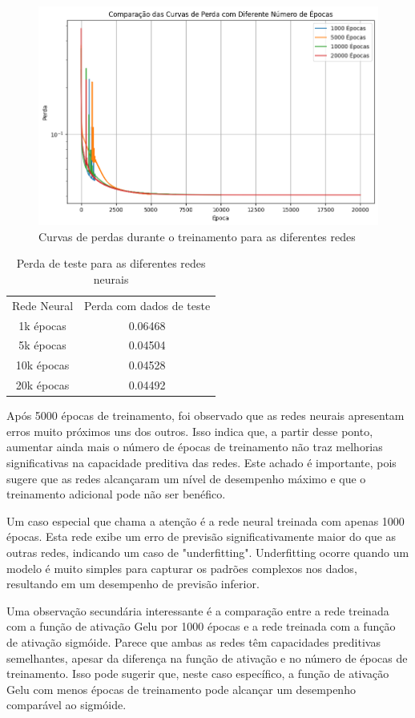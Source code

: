 \begin{figure}
	\centering
	\caption{Curvas de perdas durante o treinamento para as diferentes 
	redes}\label{tarefa02:figura:curvas}
	\includegraphics[width=0.7\linewidth]{./0803_imgs/png-241110-160937603-16503693892993531452.png}
\end{figure}

\begin{table}[htb]
	\caption{Perda de teste para as diferentes redes neurais}
	\centering
	\label{tarefa02:tabela:perdas}
\begin{tabular}{c | c}
	Rede Neural & Perda com dados de teste \\
	1k épocas  &  0.06468 \\
	5k épocas  &  0.04504 \\
	10k épocas &  0.04528 \\
	20k épocas &  0.04492
\end{tabular}
\end{table}

Após 5000 épocas de treinamento, foi observado que as redes neurais apresentam 
erros muito próximos uns dos outros. Isso indica que, a partir desse ponto, 
aumentar ainda mais o número de épocas de treinamento não traz melhorias 
significativas na capacidade preditiva das redes. Este achado é importante, 
pois sugere que as redes alcançaram um nível de desempenho máximo e que o 
treinamento adicional pode não ser benéfico.

Um caso especial que chama a atenção é a rede neural treinada com apenas 1000 
épocas. Esta rede exibe um erro de previsão significativamente maior do que as 
outras redes, indicando um caso de "underfitting". Underfitting ocorre quando 
um modelo é muito simples para capturar os padrões complexos nos dados, 
resultando em um desempenho de previsão inferior.

Uma observação secundária interessante é a comparação entre a rede treinada com 
a função de ativação Gelu por 1000 épocas e a rede treinada com a função de 
ativação sigmóide. Parece que ambas as redes têm capacidades preditivas 
semelhantes, apesar da diferença na função de ativação e no número de épocas de 
treinamento. Isso pode sugerir que, neste caso específico, a função de ativação 
Gelu com menos épocas de treinamento pode alcançar um desempenho comparável ao 
sigmóide.

